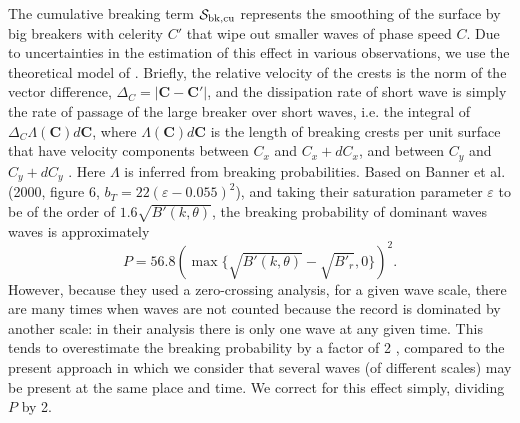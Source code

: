 The cumulative breaking term ${\cal S}_{\mathrm{bk,cu}}$ represents the smoothing
of the surface by big breakers with celerity $C'$ that wipe out smaller waves
of phase speed $C$. Due to uncertainties in the estimation of this effect in
various observations, we use the theoretical model of
\cite{art:Aea09}. Briefly, the relative velocity of the crests is the norm of
the vector difference, $\Delta_C =\left|\mathbf{C}-\mathbf{C}'\right|$, and
the dissipation rate of short wave is simply the rate of passage of the large
breaker over short waves, i.e. the integral of $\Delta_C \Lambda(\mathbf{C})
d\mathbf{C}$, where $\Lambda (\mathbf{C}) d\mathbf{C}$ is the length of
breaking crests per unit surface that have velocity components between $C_x$
and $C_x+dC_x$, and between $C_y$ and $C_y+dC_y$ \citep{art:Phi85}.  Here
$\Lambda$ is inferred from breaking probabilities. Based on Banner et
al. (2000, figure 6, $b_T=22
\left(\varepsilon-0.055\right)^2$)\nocite{art:BBY00}, and taking their
saturation parameter $\varepsilon$ to be of the order of $1.6
\sqrt{B'(k,\theta)}$, the breaking probability of dominant waves waves is
approximately
\begin{equation}
P=56.8\left(\max\{\sqrt{B'(k,\theta)}-\sqrt{B'_r},0\}\right)^2.\label{PBanner}
\end{equation}
However, because they used a zero-crossing analysis, for a given wave scale,
there are many times when waves are not counted because the record is
dominated by another scale: in their analysis there is only one wave at any
given time.  This tends to overestimate the breaking probability by a factor
of 2 \citep{art:FAB10}, compared to the present approach in which we consider
that several waves (of different scales) may be present at the same place and
time. We correct for this effect simply, dividing $P$ by 2.

